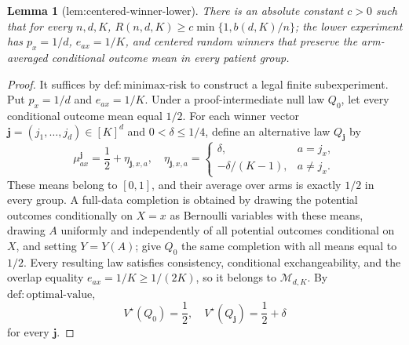 \documentclass{article}
\newtheorem{lemma}{Lemma}
\begin{document}
\begin{lemma}[lem:centered-winner-lower]\label{lem:centered-winner-lower}
There is an absolute constant \(c>0\) such that for every \(n,d,K\), \(R(n,d,K)\ge c\min\{1,b(d,K)/n\}\); the lower experiment has \(p_x=1/d\), \(e_{ax}=1/K\), and centered random winners that preserve the arm-averaged conditional outcome mean in every patient group.
\end{lemma}
\begin{proof}
It suffices by \(\mathrm{def{:}minimax\text{-}risk}\) to construct a legal finite subexperiment.  Put \(p_x=1/d\) and \(e_{ax}=1/K\).  Under a proof-intermediate null law \(Q_0\), let every conditional outcome mean equal \(1/2\).  For each winner vector \(\mathbf j=(j_1,\ldots,j_d)\in[K]^d\) and \(0<\delta\leq1/4\), define an alternative law \(Q_{\mathbf j}\) by
\[
 \mu^{\mathbf j}_{ax}=\frac12+\eta_{\mathbf j,x,a},\quad
 \eta_{\mathbf j,x,a}=
 \begin{cases}
 \delta,&a=j_x,\\
 -\delta/(K-1),&a\neq j_x.
 \end{cases}
\]
These means belong to \([0,1]\), and their average over arms is exactly \(1/2\) in every group.  A full-data completion is obtained by drawing the potential outcomes conditionally on \(X=x\) as Bernoulli variables with these means, drawing \(A\) uniformly and independently of all potential outcomes conditional on \(X\), and setting \(Y=Y(A)\); give \(Q_0\) the same completion with all means equal to \(1/2\).  Every resulting law satisfies consistency, conditional exchangeability, and the overlap equality \(e_{ax}=1/K\geq1/(2K)\), so it belongs to \(\mathcal M_{d,K}\).  By \(\mathrm{def{:}optimal\text{-}value}\),
\[
 V^\star(Q_0)=\frac12,\quad V^\star(Q_{\mathbf j})=\frac12+\delta
\]
for every \(\mathbf j\).


\end{proof}
\end{document}
